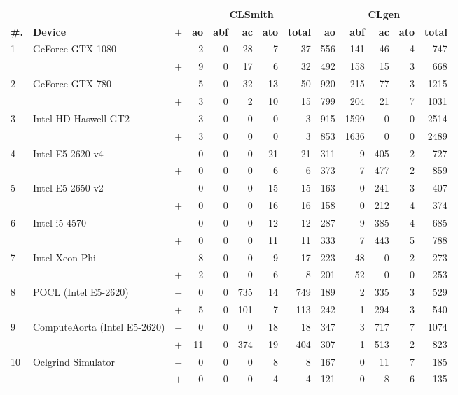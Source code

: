   \begin{tabular}{lll | rrrrr | rrrrr }
  \toprule
  & & & \multicolumn{5}{c|}{\textbf{CLSmith}} & \multicolumn{5}{c}{\textbf{CLgen}} \\
  \textbf{\#.} & \textbf{Device} & $\pm$ &
  \textbf{ao} & \textbf{abf} & \textbf{ac} & \textbf{ato} & \textbf{total} &
  \textbf{ao} & \textbf{abf} & \textbf{ac} & \textbf{ato} & \textbf{total} \\
  \midrule
  \multirow{ 2}{*}{1} & \multirow{ 2}{*}{GeForce GTX 1080} & $-$ & 2 & 0 & 28 & 7 & 37       & 556 & 141 & 46 & 4 & 747 \\& & $+$ & 9 & 0 & 17 & 6 & 32 & 492 & 158 & 15 & 3 & 668 \\
\hline
\multirow{ 2}{*}{2} & \multirow{ 2}{*}{GeForce GTX 780} & $-$ & 5 & 0 & 32 & 13 & 50       & 920 & 215 & 77 & 3 & 1215 \\& & $+$ & 3 & 0 & 2 & 10 & 15 & 799 & 204 & 21 & 7 & 1031 \\
\hline
\multirow{ 2}{*}{3} & \multirow{ 2}{*}{Intel HD Haswell GT2} & $-$ & 3 & 0 & 0 & 0 & 3       & 915 & 1599 & 0 & 0 & 2514 \\& & $+$ & 3 & 0 & 0 & 0 & 3 & 853 & 1636 & 0 & 0 & 2489 \\
\hline
\multirow{ 2}{*}{4} & \multirow{ 2}{*}{Intel E5-2620 v4} & $-$ & 0 & 0 & 0 & 21 & 21       & 311 & 9 & 405 & 2 & 727 \\& & $+$ & 0 & 0 & 0 & 6 & 6 & 373 & 7 & 477 & 2 & 859 \\
\hline
\multirow{ 2}{*}{5} & \multirow{ 2}{*}{Intel E5-2650 v2} & $-$ & 0 & 0 & 0 & 15 & 15       & 163 & 0 & 241 & 3 & 407 \\& & $+$ & 0 & 0 & 0 & 16 & 16 & 158 & 0 & 212 & 4 & 374 \\
\hline
\multirow{ 2}{*}{6} & \multirow{ 2}{*}{Intel i5-4570} & $-$ & 0 & 0 & 0 & 12 & 12       & 287 & 9 & 385 & 4 & 685 \\& & $+$ & 0 & 0 & 0 & 11 & 11 & 333 & 7 & 443 & 5 & 788 \\
\hline
\multirow{ 2}{*}{7} & \multirow{ 2}{*}{Intel Xeon Phi} & $-$ & 8 & 0 & 0 & 9 & 17       & 223 & 48 & 0 & 2 & 273 \\& & $+$ & 2 & 0 & 0 & 6 & 8 & 201 & 52 & 0 & 0 & 253 \\
\hline
\multirow{ 2}{*}{8} & \multirow{ 2}{*}{POCL (Intel E5-2620)} & $-$ & 0 & 0 & 735 & 14 & 749       & 189 & 2 & 335 & 3 & 529 \\& & $+$ & 5 & 0 & 101 & 7 & 113 & 242 & 1 & 294 & 3 & 540 \\
\hline
\multirow{ 2}{*}{9} & \multirow{ 2}{*}{ComputeAorta (Intel E5-2620)} & $-$ & 0 & 0 & 0 & 18 & 18       & 347 & 3 & 717 & 7 & 1074 \\& & $+$ & 11 & 0 & 374 & 19 & 404 & 307 & 1 & 513 & 2 & 823 \\
\hline
\multirow{ 2}{*}{10} & \multirow{ 2}{*}{Oclgrind Simulator} & $-$ & 0 & 0 & 0 & 8 & 8       & 167 & 0 & 11 & 7 & 185 \\& & $+$ & 0 & 0 & 0 & 4 & 4 & 121 & 0 & 8 & 6 & 135 \\
  \bottomrule
\end{tabular}

